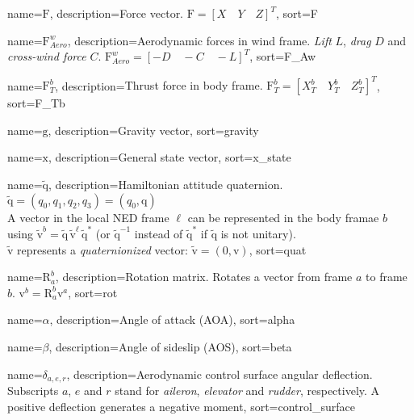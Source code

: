 {
	name={$\bm{\mathrm{F}}$},
	description={Force vector. $\bm{\mathrm{F}} = [X \quad Y \quad Z]^T$},
	sort=F
}

{
	name={$\bm{\mathrm{F}}_{Aero}^w$},
	description={Aerodynamic forces in wind frame. \textit{Lift} $L$, \textit{drag} $D$ and \textit{cross-wind force} $C$. $\bm{\mathrm{F}}_{Aero}^w = [-D \quad -C \quad -L]^T$},
	sort=F_Aw
}

{
	name={$\bm{\mathrm{F}}_T^b$},
	description={Thrust force in body frame. $\bm{\mathrm{F}}_T^b = [X_T^b \quad Y_T^b \quad Z_T^b]^T$},
	sort=F_Tb
}

{
	name={$\bm{\mathrm{g}}$},
	description={Gravity vector},
	sort=gravity
}

{
	name={$\bm{\mathrm{x}}$},
	description={General state vector},
	sort=x_state
}

{
	name={$\bm{\mathrm{\tilde{q}}}$},
	description={Hamiltonian attitude quaternion.
				 $\bm{\mathrm{\tilde{q}}} = (q_0, q_1, q_2, q_3) = (q_0, \bm{\mathrm{q}})$\\
				 A vector in the local NED frame $\ell$ can be represented in the body framae $b$ using
				 $\bm{\mathrm{\tilde{v}}}^b = \bm{\mathrm{\tilde{q}}} \, \bm{\mathrm{\tilde{v}}}^\ell \, \bm{\mathrm{\tilde{q}}}^*$ (or $\bm{\mathrm{\tilde{q}}}^{-1}$
				 instead of $\bm{\mathrm{\tilde{q}}}^*$ if $\bm{\mathrm{\tilde{q}}}$ is not unitary).\\
				 $\bm{\mathrm{\tilde{v}}}$ represents a \textit{quaternionized} vector: $\bm{\mathrm{\tilde{v}}} = (0,\bm{\mathrm{v}})$},
	sort=quat
}

{
	name={$\bm{\mathrm{R}}_a^b$},
	description={Rotation matrix. Rotates a vector from frame $a$ to frame $b$. $\bm{\mathrm{v}}^b = \bm{\mathrm{R}}_a^b \bm{\mathrm{v}}^a$},
	sort=rot
}

{
	name={$\alpha$},
	description={Angle of attack (AOA)},
	sort=alpha
}

{
	name={$\beta$},
	description={Angle of sideslip (AOS)},
	sort=beta
}

{
	name={$\delta_{a,e,r}$},
	description={Aerodynamic control surface angular deflection. Subscripts $a$, $e$ and $r$ stand for \textit{aileron}, \textit{elevator} and \textit{rudder}, respectively. A positive deflection generates a negative moment},
	sort=control_surface
}

